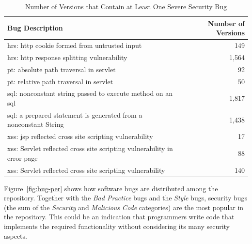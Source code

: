 \documentclass[conference]{llncs}
\begin{document}
\begin{table}
\centering
\caption{Number of Versions that Contain at Least One Severe Security Bug}
\label{tbl:sev}
\leavevmode
	\begin{tabular}{l r}
	\hline
	Bug Description & Number of Versions\\
 	\hline
	{\sc hrs}: {\sc http} cookie formed from untrusted input & 149\\
	{\sc hrs}: {\sc http} response splitting vulnerability & 1,564\\
	{\sc pt}: absolute path traversal in servlet  & 92\\
	{\sc pt}: relative path traversal in servlet & 50\\
	{\sc sql}: nonconstant string passed to execute method on an {\sc sql} & 1,817\\
	{\sc sql}: a prepared statement is generated from a nonconstant String & 1,438\\
	{\sc xss}: {\sc jsp} reflected cross site scripting vulnerability & 17\\
	{\sc xss}: Servlet reflected cross site scripting vulnerability in error page & 88\\
	{\sc xss}: Servlet reflected cross site scripting vulnerability & 140\\
	\hline
	\end{tabular}
\end{table}

Figure~\ref{fig:bug-per} shows how software bugs are distributed among the
repository. Together with the {\it Bad Practice} bugs and the {\it Style} bugs,
security bugs (the sum of the {\it Security} and {\it Malicious Code}
categories) are the most popular in the repository. This could be an indication
that programmers write code that implements the required functionality without considering
its many security aspects.
\end{document}
